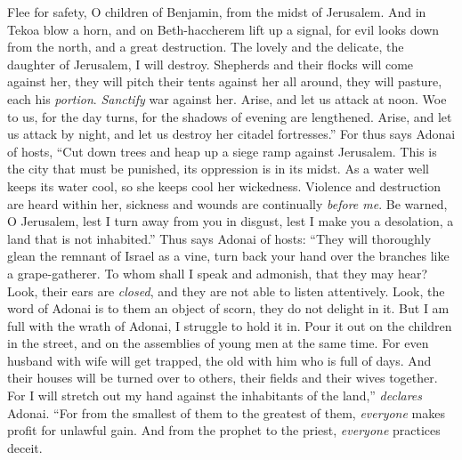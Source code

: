 \begin{biblechapter} %
\verse Flee for safety, O children of Benjamin, 
from the midst of Jerusalem. 
And in Tekoa blow a horn, 
and on Beth-haccherem lift up a signal, 
for evil looks down from the north, 
and a great destruction.
\verse The lovely and the delicate, 
the daughter of Jerusalem, I will destroy.
\verse Shepherds and their flocks will come against her, 
they will pitch their tents against her all around, 
they will pasture, each his \textit{portion}.
\verse \textit{Sanctify} war against her. 
Arise, and let us attack at noon. 
Woe to us, for the day turns, 
for the shadows of evening are lengthened.
\verse Arise, and let us attack by night, 
and let us destroy her citadel fortresses.”
\verse For thus says Adonai of hosts, 
“Cut down trees and heap up a siege ramp against Jerusalem. 
This is the city that must be punished, 
its oppression is in its midst.
\verse As a water well keeps its water cool, 
so she keeps cool her wickedness. 
Violence and destruction are heard within her, 
sickness and wounds are continually \textit{before me}.
\verse Be warned, O Jerusalem, 
lest I turn away from you in disgust, 
lest I make you a desolation, 
a land that is not inhabited.”
\verse Thus says Adonai of hosts: 
“They will thoroughly glean the remnant of Israel as a vine, 
turn back your hand over the branches like a grape-gatherer.
\verse To whom shall I speak and admonish, 
that they may hear? 
Look, their ears are \textit{closed}, 
and they are not able to listen attentively. 
Look, the word of Adonai is to them an object of scorn, 
they do not delight in it.
\verse But I am full with the wrath of Adonai, 
I struggle to hold it in. 
Pour it out on the children in the street, 
and on the assemblies of young men at the same time. 
For even husband with wife will get trapped, 
the old with him who is full of days.
\verse And their houses will be turned over to others, 
their fields and their wives together. 
For I will stretch out my hand 
against the inhabitants of the land,” \textit{declares} Adonai.
\verse “For from the smallest of them to the greatest of them, 
\textit{everyone} makes profit for unlawful gain. 
And from the prophet to the priest, 
\textit{everyone} practices deceit.

\end{biblechapter}
